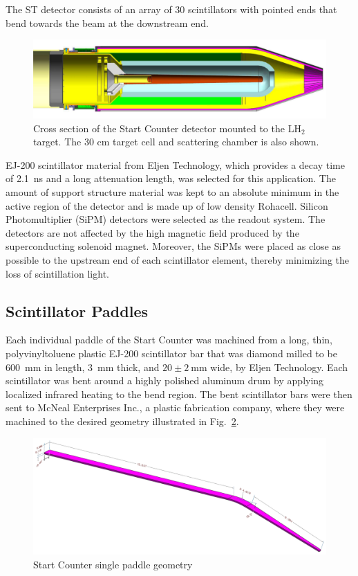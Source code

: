 The ST detector consists of an array of 30 scintillators with pointed ends that bend towards the beam at the downstream end. 
	\begin{figure}[!htb]
		\centering
		\includegraphics[width=1.0\columnwidth]{design/figs/st_target_cs}
		\caption{Cross section of the Start Counter detector mounted to the $\mathrm{LH_2}$ target. The 30 cm target cell and scattering chamber is also shown.}
		\label{fig:sttargetcs}
	\end{figure}
EJ-200 scintillator material from Eljen Technology\cite{eljen}, which provides a decay time of 2.1~ns and a long attenuation length\cite{ej200_specs}, was selected for this application.  The amount of support structure material was kept to an absolute minimum in the active region of the detector and is made up of low density Rohacell\cite{rohacell}. Silicon Photomultiplier (SiPM) detectors were selected as the readout system. The detectors are not affected by the high magnetic field produced by the superconducting solenoid magnet. Moreover, the SiPMs were placed as close as possible to the upstream end of each scintillator element, thereby minimizing the loss of scintillation light\cite{pooser16}.

\subsection{Scintillator Paddles} \label{sec:design_paddles}

Each individual paddle of the Start Counter was machined from a long, thin, polyvinyltoluene plastic EJ-200 scintillator bar that was diamond milled to be 600~mm in length, 3~mm thick, and $\mathrm{20 \pm 2\ mm}$ wide, by Eljen Technology.  Each scintillator was bent around a highly polished aluminum drum by applying localized infrared heating to the bend region.  The bent scintillator bars were then sent to McNeal Enterprises Inc.\cite{mcneal}, a plastic fabrication company, where they were machined to the desired geometry illustrated in Fig.~\ref{fig:stpaddleiso}.
	\begin{figure}[!htb]
		\centering
		\includegraphics[width=1.0\columnwidth]{design/figs/st_paddle_iso}
		\caption{Start Counter single paddle geometry}
		\label{fig:stpaddleiso}
	\end{figure}

